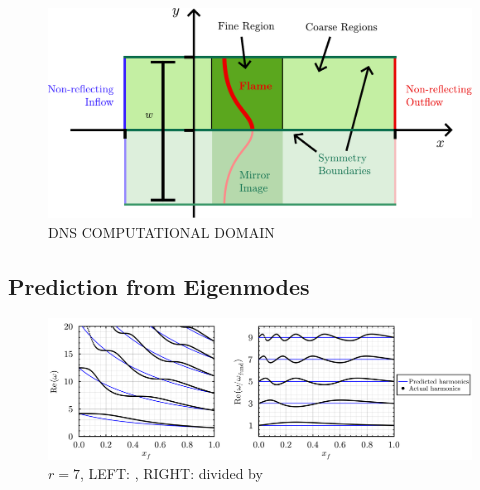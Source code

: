 \begin{figure}[t]
\centering
\includegraphics[scale=0.65]{assets/imgs/DNS-computational-domain.pdf}
\caption{DNS COMPUTATIONAL DOMAIN}
\label{fig:DNS-domain}
\end{figure}







\subsection{Prediction from Eigenmodes}


\begin{figure}[t]
\centering
\includegraphics[scale=0.35]{assets/graphs/r=7_harmonics_both.pdf}
\caption{$r = 7$, LEFT: , RIGHT: divided by }
\label{fig:flame-harmonics}
\end{figure}

